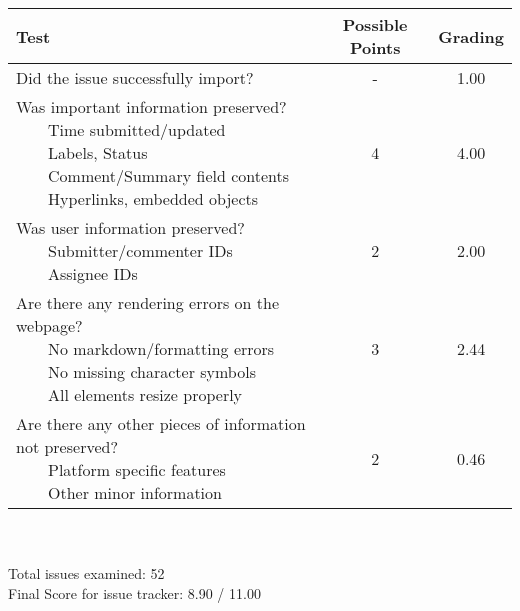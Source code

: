 \documentclass{article}
\newcommand{\tabitem}{~~\llap{\textbullet}~~}
\begin{document}
\begin{adjustbox}{center}
	\renewcommand{\arraystretch}{1.5}
	\begin{tabular}{ p{6cm} | c | c }
		Test & Possible Points & Grading \\ \hline
		Did the issue successfully import? & - & 1.00 \\
		\hline
		\makecell[l]{
			Was important information preserved? \\
			\tabitem Time submitted/updated \\
			\tabitem Labels, Status \\
			\tabitem Comment/Summary field contents \\
			\tabitem Hyperlinks, embedded objects}
		& 4 & 4.00 \\
		\hline
		\makecell[l]{
			Was user information preserved? \\
			\tabitem Submitter/commenter IDs \\
			\tabitem Assignee IDs
		} & 2 & 2.00 \\
		\hline
		\makecell[{{p{6cm}}}]{
			Are there any rendering errors on the webpage? \\
			\tabitem No markdown/formatting errors \\
			\tabitem No missing character symbols \\
			\tabitem All elements resize properly
		} & 3 & 2.44 \\
		\hline
		\makecell[{{p{6cm}}}]{
			Are there any other pieces of information not preserved? \\
			\tabitem Platform specific features \\
			\tabitem Other minor information
		} & 2 & 0.46 \\
	\end{tabular}
\end{adjustbox}
\\
\\Total issues examined: 52\\Final Score for issue tracker: 8.90 / 11.00 \\ \\\begin{adjustbox}{center}
\end{adjustbox}
\end{document}
